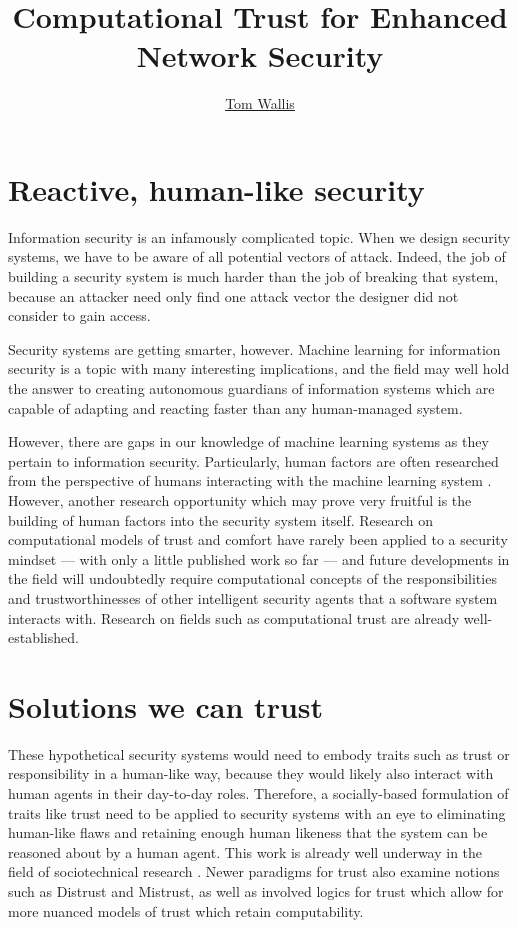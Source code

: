 \documentclass{tufte-handout}
\title{Computational Trust for Enhanced Network Security}
\author[Tom Wallis]{\href{http://tomwallis.net}{Tom Wallis}}
\date{}  %
\begin{document}
\maketitle%

\bigskip

\section{Reactive, human-like security}
Information security is an infamously complicated topic. When we design security systems, we have to be aware of all potential vectors of attack. Indeed, the job of building a security system is much harder than the job of breaking that system, because an attacker need only find one attack vector the designer did not consider to gain access. \par

Security systems are getting smarter, however. Machine learning for information security is a topic with many interesting implications, and the field may well hold the answer to creating autonomous guardians of information systems which are capable of adapting and reacting faster than any human-managed system. \par

However, there are gaps in our knowledge of machine learning systems as they pertain to information security. Particularly, human factors are often researched from the perspective of humans interacting with the machine learning system \cite{Barreno06canmachine}. However, another research opportunity which may prove very fruitful is the building of human factors into the security system itself. Research on computational models of trust and comfort have rarely been applied to a security mindset --- with only a little published work so far \cite{nokiaresearch} --- and future developments in the field will undoubtedly require computational concepts of
the responsibilities and trustworthinesses of other intelligent security agents that a software system interacts with. Research on fields such as computational trust are already well-established. \par

\section{Solutions we can trust}
These hypothetical security systems would need to embody traits such as trust or responsibility in a human-like way, because they would likely also interact with human agents in their day-to-day roles. Therefore, a socially-based formulation of traits like trust need to be applied to security systems with an eye to eliminating human-like flaws and retaining enough human likeness that the system can be reasoned about by a human agent. This work is already well underway in the field of sociotechnical research \cite{Marsh1994}. Newer paradigms for trust also examine notions such as Distrust and Mistrust, as well as involved logics for trust \cite{Kramdi} which allow for more nuanced models of trust which retain computability. \par
\end{document}
